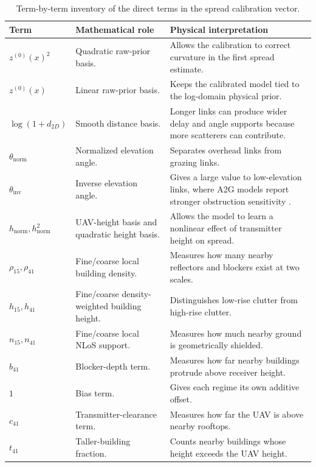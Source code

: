 \begin{table}[H]
\centering
\small
\begin{tabularx}{\textwidth}{p{3.2cm} X X}
\toprule
\textbf{Term} & \textbf{Mathematical role} & \textbf{Physical interpretation} \\
\midrule
\(z^{(0)}(x)^2\) & Quadratic raw-prior basis. & Allows the calibration to correct curvature in the first spread estimate. \\
\(z^{(0)}(x)\) & Linear raw-prior basis. & Keeps the calibrated model tied to the log-domain physical prior. \\
\(\log(1+d_{2D})\) & Smooth distance basis. & Longer links can produce wider delay and angle supports because more scatterers can contribute. \\
\(\theta_{\mathrm{norm}}\) & Normalized elevation angle. & Separates overhead links from grazing links. \\
\(\theta_{\mathrm{inv}}\) & Inverse elevation angle. & Gives a large value to low-elevation links, where A2G models report stronger obstruction sensitivity \cite{khawaja_survey,tr38901}. \\
\(h_{\mathrm{norm}},h_{\mathrm{norm}}^2\) & UAV-height basis and quadratic height basis. & Allows the model to learn a nonlinear effect of transmitter height on spread. \\
\(\rho_{15},\rho_{41}\) & Fine/coarse local building density. & Measures how many nearby reflectors and blockers exist at two scales. \\
\(h_{15},h_{41}\) & Fine/coarse density-weighted building height. & Distinguishes low-rise clutter from high-rise clutter. \\
\(n_{15},n_{41}\) & Fine/coarse local NLoS support. & Measures how much nearby ground is geometrically shielded. \\
\(b_{41}\) & Blocker-depth term. & Measures how far nearby buildings protrude above receiver height. \\
\(1\) & Bias term. & Gives each regime its own additive offset. \\
\(c_{41}\) & Transmitter-clearance term. & Measures how far the UAV is above nearby rooftops. \\
\(t_{41}\) & Taller-building fraction. & Counts nearby buildings whose height exceeds the UAV height. \\
\bottomrule
\end{tabularx}
\caption{Term-by-term inventory of the direct terms in the spread calibration vector.}
\label{tab:x79_term_inventory}
\end{table}

